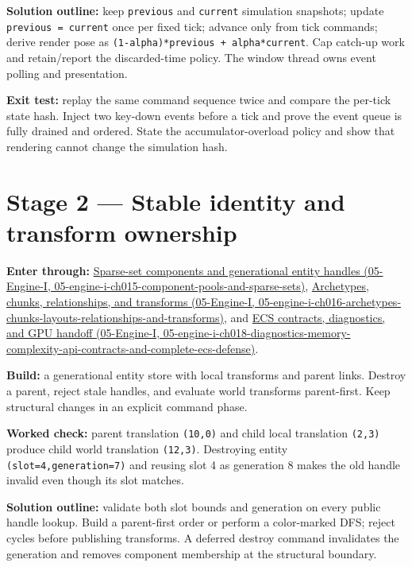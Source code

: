 \textbf{Solution outline:} keep \texttt{previous} and \texttt{current} simulation snapshots; update \texttt{previous\ =\ current} once per fixed tick; advance only from tick commands; derive render pose as \texttt{(1-alpha)*previous\ +\ alpha*current}. Cap catch-up work and retain/report the discarded-time policy. The window thread owns event polling and presentation.

\textbf{Exit test:} replay the same command sequence twice and compare the per-tick state hash. Inject two key-down events before a tick and prove the event queue is fully drained and ordered. State the accumulator-overload policy and show that rendering cannot change the simulation hash.

\section{Stage 2 --- Stable identity and transform ownership}\label{06-engine-ii-ch042-stage-2-stable-identity-and-transform-ownership}

\textbf{Enter through:} \href{../05-Engine-I/main.pdf\#nameddest=05-engine-i-ch015-component-pools-and-sparse-sets}{Sparse-set components and generational entity handles (05-Engine-I, 05-engine-i-ch015-component-pools-and-sparse-sets)}, \href{../05-Engine-I/main.pdf\#nameddest=05-engine-i-ch016-archetypes-chunks-layouts-relationships-and-transforms}{Archetypes, chunks, relationships, and transforms (05-Engine-I, 05-engine-i-ch016-archetypes-chunks-layouts-relationships-and-transforms)}, and \href{../05-Engine-I/main.pdf\#nameddest=05-engine-i-ch018-diagnostics-memory-complexity-api-contracts-and-complete-ecs-defense}{ECS contracts, diagnostics, and GPU handoff (05-Engine-I, 05-engine-i-ch018-diagnostics-memory-complexity-api-contracts-and-complete-ecs-defense)}.

\textbf{Build:} a generational entity store with local transforms and parent links. Destroy a parent, reject stale handles, and evaluate world transforms parent-first. Keep structural changes in an explicit command phase.

\textbf{Worked check:} parent translation \texttt{(10,0)} and child local translation \texttt{(2,3)} produce child world translation \texttt{(12,3)}. Destroying entity \texttt{(slot=4,generation=7)} and reusing slot 4 as generation 8 makes the old handle invalid even though its slot matches.

\textbf{Solution outline:} validate both slot bounds and generation on every public handle lookup. Build a parent-first order or perform a color-marked DFS; reject cycles before publishing transforms. A deferred destroy command invalidates the generation and removes component membership at the structural boundary.

